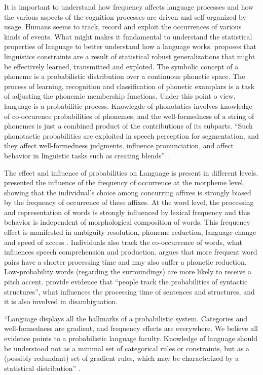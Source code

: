 It is important to understand how frequency affects language processes and how the various
aspects of the cognition processes are driven and self-organized by usage.  
Humans seems to track, record and exploit the occurrences of various kinds of events.
What might makes it fundamental to understand the statistical properties of language
to better understand how a language works.
\cite{pierrehumbert2003} proposes that linguistics constraints are a result of statistical robust generalizations
that might be effectively learned, transmitted and exploted.
The symbolic concept of a phoneme is a probabilistic distribution over a continuous phonetic space.
The process of learning, recognition and classification of phonetic examplars is a task
of adjusting the phonemic membership functions. Under this point o view, language is a probabilitic process.
Knowlegde of phonotatics involves knowledge of co-occurence probabilities of phonemes, and the well-formedness
of a string of phonemes is just a combined product of the contributions of its subparts.
``Such phonotactic probabilities are exploited in speech perception for segmentation,
and they affect well-formedness judgments, influence pronunciation, and
affect behavior in linguistic tasks such as creating blends'' \citep{bod2003}.

The effect and influence of probabilities on Language is present in different levels.
\cite{baayen2003} presented the influence of the frequency of occurrence at the morpheme level,
showing that the individual's choice among concurring affixes is strongly biased by the frequency
of occurrence of these affixes. At the word level, the processing and representation of words
is strongly influenced by lexical frequency and this behavior is independent of morphological
composition of words. This frequency effect is manifested in ambiguity resolution,
phoneme reduction, language change and speed of access \citep{bod2003}.
Individuals also track the co-occurrence of words, what influences speech comprehension 
and production. \cite{jurafsky2003} argues that more frequent word pairs have a shorter processing time and
may also suffer a phonetic reduction. Low-probability words (regarding the surroundings)
are more likely to receive a pitch accent. \cite{jurafsky2003} provide evidence that 
``people track the probabilities of syntactic structures'', what influences the processing time
of sentences and structures, and it is also involved in disambiguation.

``Language displays all the hallmarks of a probabilistic system. Categories
and well-formedness are gradient, and frequency effects are everywhere.
We believe all evidence points to a probabilistic language faculty.
Knowledge of language should be understood not as a minimal set of
categorical rules or constraints, but as a (possibly redundant) set of gradient 
rules, which may be characterized by a statistical distribution'' \citep{bod2003}.

